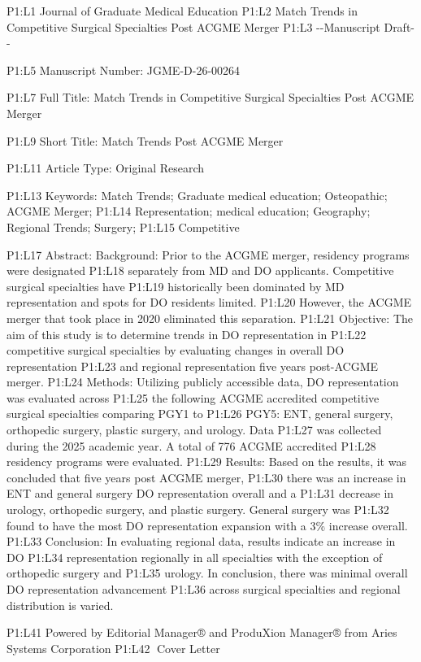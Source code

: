 P1:L1 Journal of Graduate Medical Education P1:L2 Match Trends in
Competitive Surgical Specialties Post ACGME Merger P1:L3 -\/-Manuscript
Draft-\/-

P1:L5 Manuscript Number: JGME-D-26-00264

P1:L7 Full Title: Match Trends in Competitive Surgical Specialties Post
ACGME Merger

P1:L9 Short Title: Match Trends Post ACGME Merger

P1:L11 Article Type: Original Research

P1:L13 Keywords: Match Trends; Graduate medical education; Osteopathic;
ACGME Merger; P1:L14 Representation; medical education; Geography;
Regional Trends; Surgery; P1:L15 Competitive

P1:L17 Abstract: Background: Prior to the ACGME merger, residency
programs were designated P1:L18 separately from MD and DO applicants.
Competitive surgical specialties have P1:L19 historically been dominated
by MD representation and spots for DO residents limited. P1:L20 However,
the ACGME merger that took place in 2020 eliminated this separation.
P1:L21 Objective: The aim of this study is to determine trends in DO
representation in P1:L22 competitive surgical specialties by evaluating
changes in overall DO representation P1:L23 and regional representation
five years post-ACGME merger. P1:L24 Methods: Utilizing publicly
accessible data, DO representation was evaluated across P1:L25 the
following ACGME accredited competitive surgical specialties comparing
PGY1 to P1:L26 PGY5: ENT, general surgery, orthopedic surgery, plastic
surgery, and urology. Data P1:L27 was collected during the 2025 academic
year. A total of 776 ACGME accredited P1:L28 residency programs were
evaluated. P1:L29 Results: Based on the results, it was concluded that
five years post ACGME merger, P1:L30 there was an increase in ENT and
general surgery DO representation overall and a P1:L31 decrease in
urology, orthopedic surgery, and plastic surgery. General surgery was
P1:L32 found to have the most DO representation expansion with a 3\%
increase overall. P1:L33 Conclusion: In evaluating regional data,
results indicate an increase in DO P1:L34 representation regionally in
all specialties with the exception of orthopedic surgery and P1:L35
urology. In conclusion, there was minimal overall DO representation
advancement P1:L36 across surgical specialties and regional distribution
is varied.

P1:L41 Powered by Editorial Manager® and ProduXion Manager® from Aries
Systems Corporation P1:L42 Cover Letter

